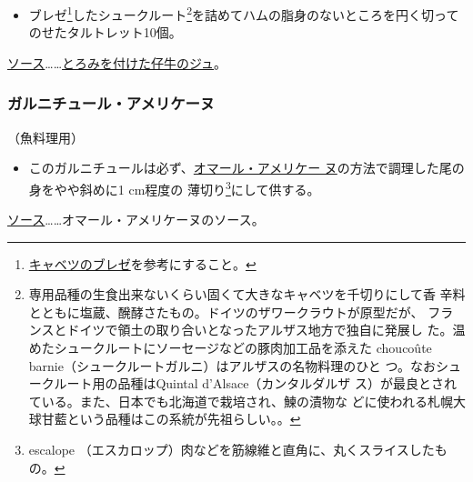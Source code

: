 \begin{recette}
\begin{itemize}
\tightlist
\item
  ブレゼ\footnote{\protect\hyperlink{chou-braise}{キャベツのブレゼ}を参考にすること。}したシュークルート\footnote{専用品種の生食出来ないくらい固くて大きなキャベツを千切りにして香
    辛料とともに塩蔵、醗酵さたもの。ドイツのザワークラウトが原型だが、
    フランスとドイツで領土の取り合いとなったアルザス地方で独自に発展し
    た。温めたシュークルートにソーセージなどの豚肉加工品を添えた
    choucoûte barnie（シュークルートガルニ）はアルザスの名物料理のひと
    つ。なおシュークルート用の品種はQuintal d'Alsace（カンタルダルザ
    ス）が最良とされている。また、日本でも北海道で栽培され、鰊の漬物な
    どに使われる札幌大球甘藍という品種はこの系統が先祖らしい。。}を詰めてハムの脂身のないところを円く切ってのせたタルトレット10個。
\end{itemize}

\ul{ソース}\ldots{}\ldots{}\protect\hyperlink{jus-de-veau-lie}{とろみを付けた仔牛のジュ}。

\hypertarget{garniture-americaine}{%
\subsubsection{ガルニチュール・アメリケーヌ}\label{garniture-americaine}}



（魚料理用）

\begin{itemize}
\tightlist
\item
  このガルニチュールは必ず、\protect\hyperlink{homard-americaine}{オマール・アメリケー
  ヌ}の方法で調理した尾の身をやや斜めに1 cm程度の 薄切り\footnote{escalope
    （エスカロップ）肉などを筋線維と直角に、丸くスライスしたもの。}にして供する。
\end{itemize}

\ul{ソース}\ldots{}\ldots{}オマール・アメリケーヌのソース。
\end{recette}